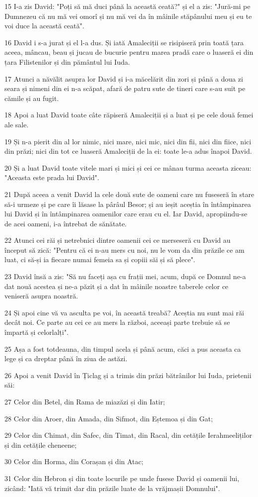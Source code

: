 \par 15 I-a zis David: "Poți să mă duci până la această ceată?" și el a zis: "Jură-mi pe Dumnezeu că nu mă vei omorî și nu mă vei da în mâinile stăpânului meu și eu te voi duce la această ceată".
\par 16 David i s-a jurat și el l-a dus. Și iată Amaleciții se risipiseră prin toată țara aceea, mâncau, beau și jucau de bucurie pentru marea pradă care o luaseră ei din țara Filistenilor și din pământul lui Iuda.
\par 17 Atunci a năvălit asupra lor David și i-a măcelărit din zori și până a doua zi seara și nimeni din ei n-a scăpat, afară de patru sute de tineri care s-au suit pe cămile și au fugit.
\par 18 Apoi a luat David toate câte răpiseră Amaleciții și a luat și pe cele două femei ale sale.
\par 19 Și n-a pierit din al lor nimic, nici mare, nici mic, nici din fii, nici din fiice, nici din prăzi; nici din tot ce luaseră Amaleciții de la ei: toate le-a adus înapoi David.
\par 20 Și a luat David toate vitele mari și mici și cei ce mânau turma aceasta ziceau: "Aceasta este prada lui David".
\par 21 După aceea a venit David la cele două sute de oameni care nu fuseseră în stare să-i urmeze și pe care îi lăsase la pârâul Besor; și au ieșit aceștia în întâmpinarea lui David și în întâmpinarea oamenilor care erau cu el. Iar David, apropiindu-se de acei oameni, i-a întrebat de sănătate.
\par 22 Atunci cei răi și netrebnici dintre oamenii cei ce merseseră cu David au început să zică: "Pentru că ei n-au mers cu noi, nu le vom da din prăzile ce am luat, ci să-și ia fiecare numai femeia sa și copiii săi și să plece".
\par 23 David însă a zis: "Să nu faceți așa cu frații mei, acum, după ce Domnul ne-a dat nouă acestea și ne-a păzit și a dat în mâinile noastre taberele celor ce veniseră asupra noastră.
\par 24 Și apoi cine vă va asculta pe voi, în această treabă? Aceștia nu sunt mai răi decât noi. Ce parte au cei ce au mers la război, aceeași parte trebuie să se împartă și celorlalți".
\par 25 Așa a fost totdeauna, din timpul acela și până acum, căci a pus aceasta ca lege și ca dreptar până în ziua de astăzi.
\par 26 Apoi a venit David în Țiclag și a trimis din prăzi bătrânilor lui Iuda, prietenii săi:
\par 27 Celor din Betel, din Rama de miazăzi și din Iatir;
\par 28 Celor din Aroer, din Amada, din Sifmot, din Eștemoa și din Gat;
\par 29 Celor din Chimat, din Safec, din Timat, din Racal, din cetățile Ierahmeeliților și din cetățile cheneene;
\par 30 Celor din Horma, din Corașan și din Atac;
\par 31 Celor din Hebron și din toate locurile pe unde fusese David și oamenii lui, zicând: "Iată vă trimit dar din prăzile luate de la vrăjmașii Domnului".

